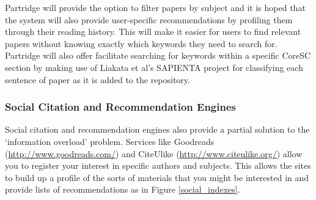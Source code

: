 \documentclass[12pt,a4paper]{article}
\begin{document}
Partridge will provide the option to filter papers by subject and it is hoped
that the system will also provide user-specific recommendations by profiling
them through their reading history. This will make it easier for users to find
relevant papers without knowing exactly which keywords they need to search for.
Partridge will also offer facilitate searching for keywords within a specific
CoreSC section by making use of Liakata et al's SAPIENTA project for
classifying each sentence of paper as it is added to the repository.

\subsubsection{Social Citation and Recommendation Engines}
Social citation and recommendation engines also provide a partial solution to
the `information overload' problem.  Services like Goodreads
(\url{http://www.goodreads.com/}) and CiteUlike
(\url{http://www.citeulike.org/}) allow you to register your interest in
specific authors and subjects. This allows the sites to build up a profile of
the sorts of materials that you might be interested in and provide lists of
recommendations as in Figure \ref{social_indexes}.
\end{document}
